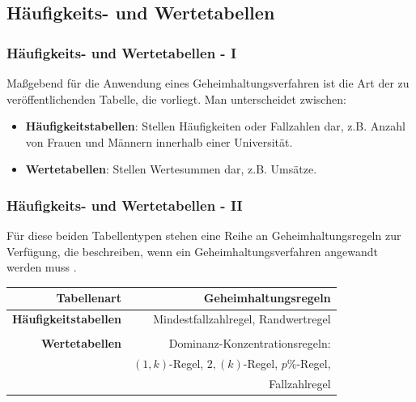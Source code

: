 \documentclass[aspectratio=169]{beamer}
\begin{document}
\subsection{Häufigkeits- und Wertetabellen}

\begin{frame}
    \frametitle{Häufigkeits- und Wertetabellen - I}
    Maßgebend für die Anwendung eines Geheimhaltungsverfahren ist die Art der zu veröffentlichenden Tabelle, die vorliegt. Man unterscheidet zwischen:
    \begin{itemize}
        \item \textbf{Häufigkeitstabellen}: Stellen Häufigkeiten oder Fallzahlen dar, z.B. Anzahl von Frauen und Männern innerhalb einer Universität.
        \item \textbf{Wertetabellen}: Stellen Wertesummen dar, z.B. Umsätze.
    \end{itemize}
\end{frame}


\begin{frame}
    \frametitle{Häufigkeits- und Wertetabellen - II}
    Für diese beiden Tabellentypen stehen eine Reihe an Geheimhaltungsregeln zur Verfügung, die beschreiben, wenn ein Geheimhaltungsverfahren angewandt werden muss \cite{Nickl}.
    \begin{center}
        \begin{tabular}{ r r }
         \textbf{Tabellenart} \vline & \textbf{Geheimhaltungsregeln} \\ 
         \hline
         \textbf{Häufigkeitstabellen} \vline & Mindestfallzahlregel, Randwertregel \\  
         \vline & \\
         \hline
         \textbf{Wertetabellen} \vline & Dominanz-Konzentrationsregeln:  \\
         \vline & $(1,k)$-Regel, $2,(k)$-Regel, $p$\%-Regel, \\
         \vline & Fallzahlregel
        \end{tabular}
    \end{center}
\end{frame}
\end{document}
